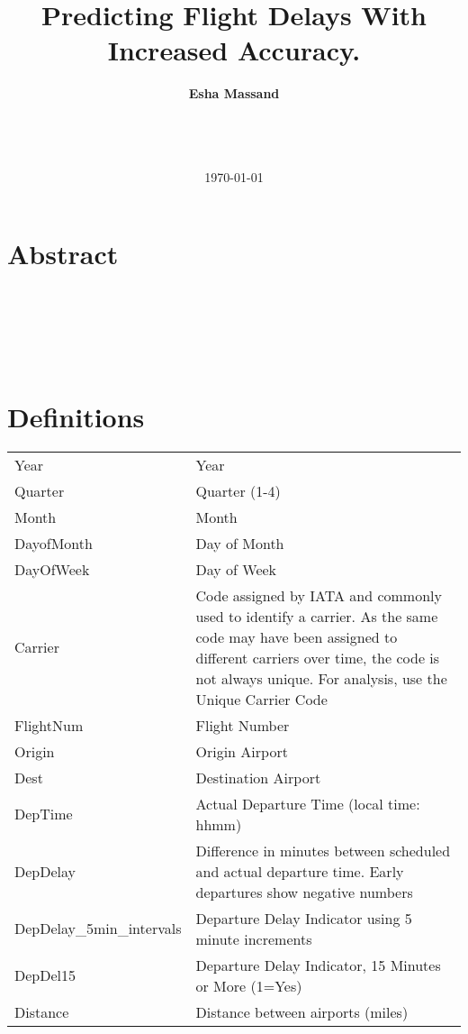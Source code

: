 \documentclass[a4paper, 11pt]{article}
\begin{document}
\LARGE\title{Predicting Flight Delays With Increased Accuracy.}

\LARGE\author{\textbf{Esha Massand}\\
\date{\mydate\today}
\\\
}

\normalsize


\maketitle


\section*{Abstract}
\begin{justify}

\end{justify}
\begin{verbatim}






\end{verbatim}


\clearpage
\tableofcontents
\clearpage

\section*{Definitions}

\begin{tabular}{l p{11cm}  }
Year& Year\\
Quarter& Quarter (1-4)\\
Month& Month\\
DayofMonth& Day of Month\\
DayOfWeek& Day of Week\\
Carrier& Code assigned by IATA and commonly used to identify a carrier. As the same code may have been assigned to different carriers over time, the code is not always unique. For analysis, use the Unique Carrier Code\\
FlightNum& Flight Number\\
Origin& Origin Airport\\
Dest& Destination Airport\\
DepTime& Actual Departure Time (local time: hhmm)\\
DepDelay& Difference in minutes between scheduled and actual departure time. Early departures show negative numbers\\
DepDelay\_5min\_intervals & Departure Delay Indicator using 5 minute increments\\
DepDel15& Departure Delay Indicator, 15 Minutes or More (1=Yes)\\
Distance& Distance between airports (miles)\\
\end{tabular}
\end{document}
